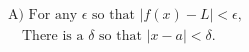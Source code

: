 \documentclass[preview]{standalone}
\begin{document}
\begin{align*}
\text{A) For any } \epsilon \text{ so that } |f(x) - L| < \epsilon, \\
                             \quad \text{There is a } \delta \text{ so that } |x - a | < \delta.
\end{align*}
\end{document}
